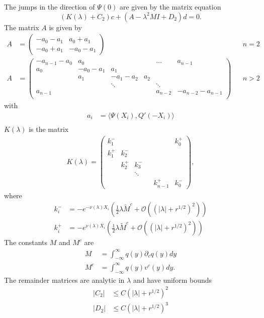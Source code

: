 \documentclass[thesis.tex]{subfiles}
\begin{document}
\begin{lemma}\label{jumpadj}
The jumps in the direction of $\Psi(0)$ are given by the matrix equation
\begin{equation}\label{Psimatrix}
\left( K(\lambda) + C_2 \right)c + (A - \lambda^2 M I + D_2)d = 0.
\end{equation}
The matrix $A$ is given by
\begin{align*}
A &= \begin{pmatrix}
-a_0 -a_1 & a_0 + a_1  \\
-a_0 + a_1 & -a_0 - a_1
\end{pmatrix} && n = 2 \\
A &= \begin{pmatrix}
-a_{n-1} - a_0 & a_0 & & & \dots & a_{n-1}\\
a_0 & -a_0 - a_1 &  a_1   \\
& a_1 & -a_1 - a_2 &  a_2 \\
& & \ddots & & \ddots \\
a_{n-1} & & & & a_{n-2} & -a_{n-2} - a_{n-1} \\
\end{pmatrix} && n > 2
\end{align*}
with
\begin{align*}
a_i &= \langle \Psi(X_i), Q'(-X_i) \rangle \\
\end{align*}
$K(\lambda)$ is the matrix
\begin{align*}
K(\lambda) =  
\begin{pmatrix}
k_1^- & & & & & k_0^+ \\
k_1^+ & k_2^- \\
& k_2^+ & k_3^- \\
  & & \ddots & && \\
& & & & k_{n-1}^+ & k_0^-
\end{pmatrix},
\end{align*}
where
\begin{align*}
k_i^- &= -e^{-\nu(\lambda)X_i}\left(\frac{1}{2}\lambda \tilde{M}^c + \mathcal{O}((|\lambda| + r^{1/2})^2) \right) \\
k_i^+ &= -e^{\nu(\lambda)X_i}\left(\frac{1}{2}\lambda \tilde{M}^c + \mathcal{O}((|\lambda| + r^{1/2})^2) \right)
\end{align*}
The constants $M$ and $M^c$ are
\begin{align*}
M &= \int_{-\infty}^\infty q(y) \partial_c q(y) dy \\
M^c &= \int_{-\infty}^\infty q(y) v^c(y) dy.
\end{align*}
The remainder matrices are analytic in $\lambda$ and have uniform bounds
\begin{align}\label{adjjumprem}
|C_2| &\leq C (|\lambda| + r^{1/2})^2 \\
|D_2| &\leq C (|\lambda| + r^{1/2})^3 
\end{align}


\end{lemma}
\end{document}

